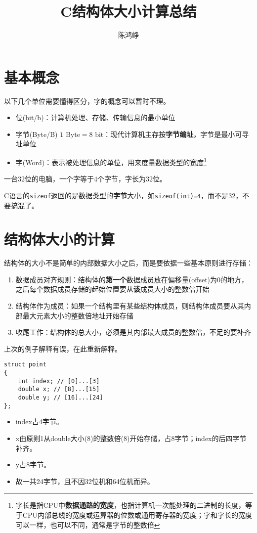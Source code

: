\documentclass[compact]{note}
\title{C结构体大小计算总结}
\author{陈鸿峥}
\date{}
\begin{document}
\maketitle
\section{基本概念}
\label{sec:introduction}
以下几个单位需要懂得区分，字的概念可以暂时不理。
\begin{itemize}
	\itemsep -3pt
	\item 位(bit/b)：计算机处理、存储、传输信息的最小单位
	\item 字节(Byte/B) $1\text{ Byte}=8\text{ bit}$：现代计算机主存按\textbf{字节编址}，字节是最小可寻址单位
	\item 字(Word)：表示被处理信息的单位，用来度量数据类型的宽度\footnote{字长是指CPU中\textbf{数据通路的宽度}，也指计算机一次能处理的二进制的长度，等于CPU内部总线的宽度或运算器的位数或通用寄存器的宽度；字和字长的宽度可以一样，也可以不同，通常是字节的整数倍}
\end{itemize}
\par 一台32位的电脑，一个字等于4个字节，字长为32位。
\par C语言的\verb'sizeof'返回的是数据类型的\textbf{字节}大小，如\verb'sizeof(int)=4'，而不是32，不要搞混了。

\section{结构体大小的计算}
结构体的大小不是简单的内部数据大小之后，而是要依据一些基本原则进行存储：
\begin{enumerate}
	\itemsep -3pt
	\item 数据成员对齐规则：结构体的\textbf{第一个}数据成员放在偏移量(offset)为0的地方，之后每个数据成员存储的起始位置要从\textbf{该}成员大小的整数倍开始
	\item 结构体作为成员：如果一个结构里有某些结构体成员，则结构体成员要从其内部最大元素大小的整数倍地址开始存储
	\item 收尾工作：结构体的总大小，必须是其内部最大成员的整数倍，不足的要补齐
\end{enumerate}

上次的例子解释有误，在此重新解释。
\begin{example}
\begin{lstlisting}
struct point
{
    int index; // [0]...[3]
    double x; // [8]...[15]
    double y; // [16]...[24]
};
\end{lstlisting}
\end{example}
\begin{analysis}
\begin{itemize}
	\itemsep -3pt
	\item index占4字节。
	\item x由原则1从double大小(8)的整数倍(8)开始存储，占8字节；index的后四字节补齐。
	\item y占8字节。
	\item 故一共24字节，且不因32位机和64位机而异。
\end{itemize}
\end{analysis}
\end{document}
